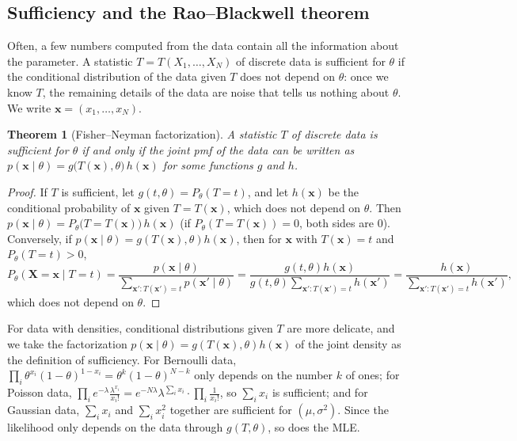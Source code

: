 \documentclass[11pt]{article}
\theoremstyle{definition}
\theoremstyle{plain}
\newtheorem{theorem}[definition]{Theorem}
\theoremstyle{remark}
\begin{document}
\subsection{Sufficiency and the Rao--Blackwell theorem}

Often, a few numbers computed from the data contain all the information about the parameter. A statistic $T = T(X_1, \ldots, X_N)$ of discrete data is sufficient for $\theta$ if the conditional distribution of the data given $T$ does not depend on $\theta$: once we know $T$, the remaining details of the data are noise that tells us nothing about $\theta$. We write $\mathbf{x} = (x_1, \ldots, x_N)$.

\begin{theorem}[Fisher--Neyman factorization]\label{thm:factorization}
    A statistic $T$ of discrete data is sufficient for $\theta$ if and only if the joint pmf of the data can be written as $p(\mathbf{x} \mid \theta) = g\big(T(\mathbf{x}), \theta\big)\,h(\mathbf{x})$ for some functions $g$ and $h$.
\end{theorem}

\begin{proof}
    If $T$ is sufficient, let $g(t, \theta) = P_\theta(T = t)$, and let $h(\mathbf{x})$ be the conditional probability of $\mathbf{x}$ given $T = T(\mathbf{x})$, which does not depend on $\theta$. Then $p(\mathbf{x} \mid \theta) = P_\theta\big(T = T(\mathbf{x})\big)\,h(\mathbf{x})$ (if $P_\theta(T = T(\mathbf{x})) = 0$, both sides are $0$). Conversely, if $p(\mathbf{x} \mid \theta) = g(T(\mathbf{x}), \theta)h(\mathbf{x})$, then for $\mathbf{x}$ with $T(\mathbf{x}) = t$ and $P_\theta(T = t) > 0$,
    \[P_\theta(\mathbf{X} = \mathbf{x} \mid T = t) = \frac{p(\mathbf{x} \mid \theta)}{\sum_{\mathbf{x}' : T(\mathbf{x}') = t} p(\mathbf{x}' \mid \theta)} = \frac{g(t, \theta)h(\mathbf{x})}{g(t, \theta)\sum_{\mathbf{x}' : T(\mathbf{x}') = t} h(\mathbf{x}')} = \frac{h(\mathbf{x})}{\sum_{\mathbf{x}' : T(\mathbf{x}') = t} h(\mathbf{x}')},\]
    which does not depend on $\theta$.
\end{proof}

For data with densities, conditional distributions given $T$ are more delicate, and we take the factorization $p(\mathbf{x} \mid \theta) = g(T(\mathbf{x}), \theta)h(\mathbf{x})$ of the joint density as the definition of sufficiency. For Bernoulli data, $\prod_i \theta^{x_i}(1 - \theta)^{1 - x_i} = \theta^k(1 - \theta)^{N - k}$ only depends on the number $k$ of ones; for Poisson data, $\prod_i e^{-\lambda}\frac{\lambda^{x_i}}{x_i!} = e^{-N\lambda}\lambda^{\sum_i x_i} \cdot \prod_i \frac{1}{x_i!}$, so $\sum_i x_i$ is sufficient; and for Gaussian data, $\sum_i x_i$ and $\sum_i x_i^2$ together are sufficient for $(\mu, \sigma^2)$. Since the likelihood only depends on the data through $g(T, \theta)$, so does the MLE.
\end{document}
